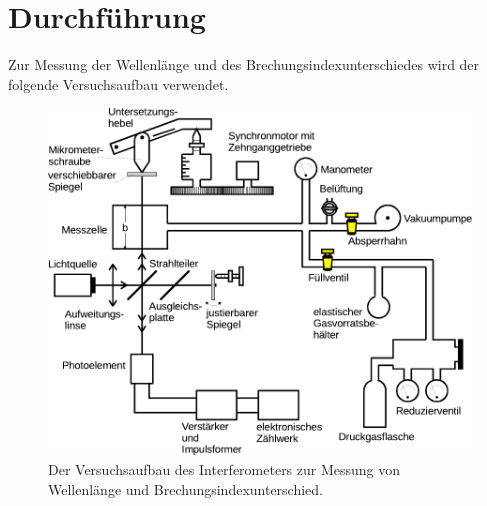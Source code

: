 \section{Durchführung}

    Zur Messung der Wellenlänge und des Brechungsindexunterschiedes wird der folgende Versuchsaufbau verwendet.

    \begin{figure}
        \centering
        \includegraphics[width=\textwidth]{content/img/Abb_7_edit.pdf}
        \caption{Der Versuchsaufbau des Interferometers zur Messung von Wellenlänge und Brechungsindexunterschied. \cite{versuchsanleitung}}
    \end{figure}

